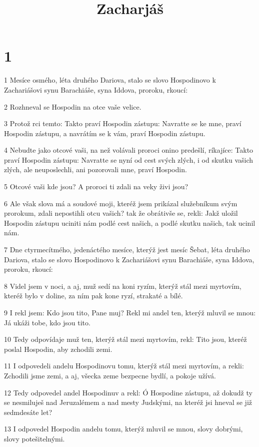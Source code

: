 

\title{Zacharjáš}

\chapter{1}

\par 1 Mesíce osmého, léta druhého Dariova, stalo se slovo Hospodinovo k Zachariášovi synu Barachiáše, syna Iddova, proroku, rkoucí:
\par 2 Rozhneval se Hospodin na otce vaše velice.
\par 3 Protož rci temto: Takto praví Hospodin zástupu: Navratte se ke mne, praví Hospodin zástupu, a navrátím se k vám, praví Hospodin zástupu.
\par 4 Nebudte jako otcové vaši, na než volávali proroci onino predešlí, ríkajíce: Takto praví Hospodin zástupu: Navratte se nyní od cest svých zlých, i od skutku vašich zlých, ale neuposlechli, ani pozorovali mne, praví Hospodin.
\par 5 Otcové vaši kde jsou? A proroci ti zdali na veky živi jsou?
\par 6 Ale však slova má a soudové moji, kteréž jsem prikázal služebníkum svým prorokum, zdali nepostihli otcu vašich? tak že obrátivše se, rekli: Jakž uložil Hospodin zástupu uciniti nám podlé cest našich, a podlé skutku našich, tak ucinil nám.
\par 7 Dne ctyrmecítmého, jedenáctého mesíce, kterýž jest mesíc Šebat, léta druhého Dariova, stalo se slovo Hospodinovo k Zachariášovi synu Barachiáše, syna Iddova, proroku, rkoucí:
\par 8 Videl jsem v noci, a aj, muž sedí na koni ryzím, kterýž stál mezi myrtovím, kteréž bylo v doline, za ním pak kone ryzí, strakaté a bílé.
\par 9 I rekl jsem: Kdo jsou tito, Pane muj? Rekl mi andel ten, kterýž mluvil se mnou: Já ukáži tobe, kdo jsou tito.
\par 10 Tedy odpovídaje muž ten, kterýž stál mezi myrtovím, rekl: Tito jsou, kteréž poslal Hospodin, aby zchodili zemi.
\par 11 I odpovedeli andelu Hospodinovu tomu, kterýž stál mezi myrtovím, a rekli: Zchodili jsme zemi, a aj, všecka zeme bezpecne bydlí, a pokoje užívá.
\par 12 Tedy odpovedel andel Hospodinuv a rekl: Ó Hospodine zástupu, až dokudž ty se nesmiluješ nad Jeruzalémem a nad mesty Judskými, na kteréž jsi hneval se již sedmdesáte let?
\par 13 I odpovedel Hospodin andelu tomu, kterýž mluvil se mnou, slovy dobrými, slovy potešitelnými.
